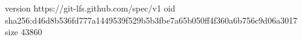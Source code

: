 version https://git-lfs.github.com/spec/v1
oid sha256:d46d8b536fd777a1449539f529b5b3fbe7a65b050ff4f360a6b756c9d06a3017
size 43860
